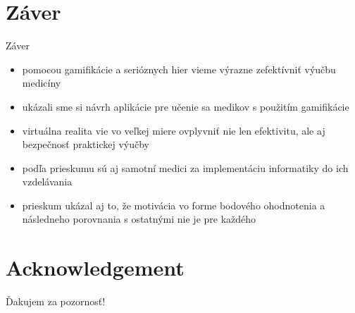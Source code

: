 \documentclass[10pt]{beamer}
\begin{document}
\section{Záver}
    \begin{frame}{Záver}
    \begin{itemize}
  \setlength\itemsep{2em}
\item pomocou gamifikácie a serióznych hier vieme výrazne zefektívniť výučbu medicíny

\item ukázali sme si návrh aplikácie pre učenie sa medikov s použitím gamifikácie

\item virtuálna realita vie vo veľkej miere ovplyvniť nie len efektivitu, ale aj bezpečnosť praktickej výučby

	
\item podľa prieskumu sú aj samotní medici za implementáciu informatiky do ich vzdelávania
	
\item prieskum ukázal aj to, že motivácia vo forme bodového ohodnotenia a následneho porovnania s ostatnými nie je pre každého


\end{itemize}
    \end{frame}
    


\section*{Acknowledgement}  
\begin{frame}
\textcolor{myNewColorA}{\Huge{\centerline{Ďakujem za pozornosť!}}}
\end{frame}
\end{document}

